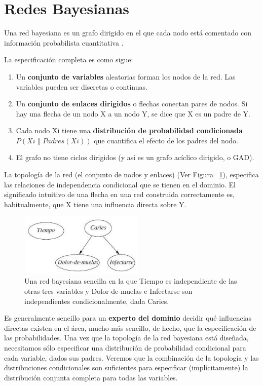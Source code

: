 \documentclass[10pt,conference]{IEEEtran}
\begin{document}
\section{\textbf{Redes Bayesianas}} 
Una red bayesiana es un grafo dirigido en el que cada nodo está comentado con información probabilista cuantitativa \citep{russell2004inteligencia}.

La especificación completa es como sigue:
\begin{enumerate}
    \item Un \textbf{conjunto de variables} aleatorias forman los nodos de la red. Las variables pueden ser discretas o continuas.
    \item Un \textbf{conjunto de enlaces dirigidos} o flechas conectan pares de nodos. Si hay una flecha de un nodo X a un nodo Y, se dice que X es un padre de Y.
    \item Cada nodo Xi tiene una \textbf{distribución de probabilidad condicionada} $P(Xi\|Padres(Xi))$ que cuantifica el efecto de los padres del nodo.
    \item El grafo no tiene ciclos dirigidos (y así es un grafo acíclico dirigido, o GAD).  
\end{enumerate}

La topología de la red (el conjunto de nodos y enlaces) (Ver Figura  ~\ref{R1}), especifica las relaciones de independencia condicional que se tienen en el dominio. El significado intuitivo de una flecha en una red construida correctamente es, habitualmente, que X tiene una influencia directa sobre Y.

\begin{figure}[H]
\begin{center}
\includegraphics[width=6cm, height=3cm]{figuras/R1.JPG}
\caption{Una red bayesiana sencilla en la que Tiempo es independiente de las otras tres variables y Dolor-de-muelas e Infectarse son independientes condicionalmente, dada Caries.}
\label{R1} 
\end{center}
\end{figure}

Es generalmente sencillo para un \textbf{experto del dominio} decidir qué influencias directas existen en el área, mucho más sencillo, de hecho, que la especificación de las probabilidades. Una vez que la topología de la red bayesiana está diseñada, necesitamos sólo especificar una distribución de probabilidad condicional para cada variable, dados sus padres. Veremos que la combinación de la topología y las distribuciones condicionales son suficientes para especificar (implícitamente) la distribución conjunta completa para todas las variables. 
\end{document}
